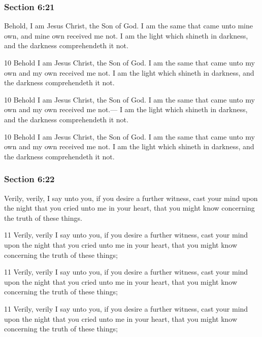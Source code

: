 	\subsubsection{Section 6:21} %
		\label{DC6-21}

		Behold, I am Jesus Christ, the Son of God. I am the same that came unto mine own, and mine own received me not. I am the light which shineth in darkness, and the darkness comprehendeth it not.

		\begin{framed}
		\scriptsize
			\begin{compactdesc}
				\item[JSP] 10 Behold I am Jesus Christ, the Son of God. I am the same that came unto my own and my own received me not. I am the light which shineth in darkness, and the darkness comprehendeth it not.
				\item[DC 1835] 10 Behold I am Jesus Christ, the Son of God. I am the same that came unto my own and my own received me not.--- I am the light which shineth in darkness, and the darkness comprehendeth it not.
				\item[DC 1844] 10 Behold I am Jesus Christ, the Son of God. I am the same that came unto my own and my own received me not. I am the light which shineth in darkness, and the darkness comprehendeth it not.
			\end{compactdesc}
		\end{framed}

	\subsubsection{Section 6:22} %
		\label{DC6-22}

		Verily, verily, I say unto you, if you desire a further witness, cast your mind upon the night that you cried unto me in your heart, that you might know concerning the truth of these things.

		\begin{framed}
		\scriptsize
			\begin{compactdesc}
				\item[JSP] 11 Verily, verily I say unto you, if you desire a further witness, cast your mind upon the night that you cried unto me in your heart, that you might know concerning the truth of these things;
				\item[DC 1835] 11 Verily, verily I say unto you, if you desire a further witness, cast your mind upon the night that you cried unto me in your heart, that you might know concerning the truth of these things;
				\item[DC 1844] 11 Verily, verily I say unto you, if you desire a further witness, cast your mind upon the night that you cried unto me in your heart, that you might know concerning the truth of these things; 
			\end{compactdesc}
		\end{framed}

